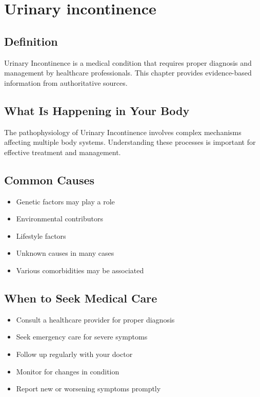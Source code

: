 
\chapter{Urinary incontinence}

\section*{Definition}
Urinary Incontinence is a medical condition that requires proper diagnosis and management by healthcare professionals. This chapter provides evidence-based information from authoritative sources.

\section*{What Is Happening in Your Body}
The pathophysiology of Urinary Incontinence involves complex mechanisms affecting multiple body systems. Understanding these processes is important for effective treatment and management.

\section*{Common Causes}
\begin{itemize}
  \item Genetic factors may play a role
  \item Environmental contributors
  \item Lifestyle factors
  \item Unknown causes in many cases
  \item Various comorbidities may be associated
\end{itemize}

\section*{When to Seek Medical Care}
\begin{itemize}
  \item Consult a healthcare provider for proper diagnosis
  \item Seek emergency care for severe symptoms
  \item Follow up regularly with your doctor
  \item Monitor for changes in condition
  \item Report new or worsening symptoms promptly
\end{itemize}

